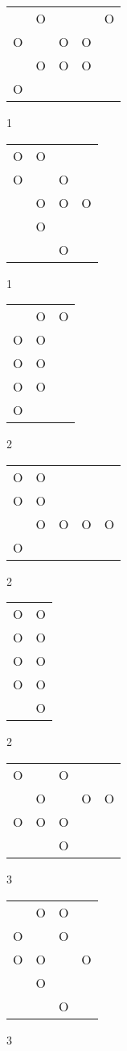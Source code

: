 \begin{tabular}{|m{0.2cm}m{0.2cm}m{0.2cm}m{0.2cm}m{0.2cm}|}\hline
 &O& & &O\\
O& &O&O& \\
 &O&O&O& \\
O& & & & \\
\hline\end{tabular}1
\begin{tabular}{|m{0.2cm}m{0.2cm}m{0.2cm}m{0.2cm}|}\hline
O&O& & \\
O& &O& \\
 &O&O&O\\
 &O& & \\
 & &O& \\
\hline\end{tabular}1
\begin{tabular}{|m{0.2cm}m{0.2cm}m{0.2cm}|}\hline
 &O&O\\
O&O& \\
O&O& \\
O&O& \\
O& & \\
\hline\end{tabular}2
\begin{tabular}{|m{0.2cm}m{0.2cm}m{0.2cm}m{0.2cm}m{0.2cm}|}\hline
O&O& & & \\
O&O& & & \\
 &O&O&O&O\\
O& & & & \\
\hline\end{tabular}2
\begin{tabular}{|m{0.2cm}m{0.2cm}|}\hline
O&O\\
O&O\\
O&O\\
O&O\\
 &O\\
\hline\end{tabular}2
\begin{tabular}{|m{0.2cm}m{0.2cm}m{0.2cm}m{0.2cm}m{0.2cm}|}\hline
O& &O& & \\
 &O& &O&O\\
O&O&O& & \\
 & &O& & \\
\hline\end{tabular}3
\begin{tabular}{|m{0.2cm}m{0.2cm}m{0.2cm}m{0.2cm}|}\hline
 &O&O& \\
O& &O& \\
O&O& &O\\
 &O& & \\
 & &O& \\
\hline\end{tabular}3
